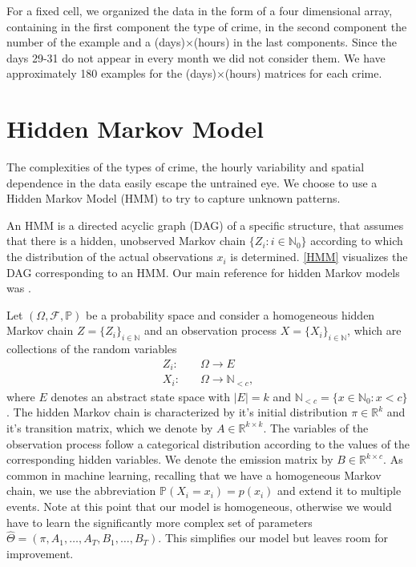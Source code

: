 \documentclass{article}
\begin{document}
For a fixed cell, we organized the data in the form of a four dimensional array, containing in the first component the type of crime, in the second component the number of the example and a (days)$\times$(hours) in the last components. Since the days 29-31 do not appear in every month we did not consider them. We have approximately 180 examples for the (days)$\times$(hours) matrices for each crime.


\section{Hidden Markov Model}
\label{sec:HMM}

The complexities of the types of crime, the hourly variability and spatial dependence in the data easily escape the untrained eye. We choose to use a Hidden Markov Model (HMM) to try to capture unknown patterns. 

An HMM is a directed acyclic graph (DAG) of a specific structure, that assumes that there is a hidden, unobserved Markov chain $\lbrace Z_i: i \in \mathbb{N}_0 \rbrace$  according to which the distribution of the actual observations $x_i$ is determined. \cref{HMM} visualizes the DAG corresponding to an HMM. Our main reference for hidden Markov models was \cite{hmc:em:baum}.


Let $(\Omega,\mathcal{F},\mathbb{P})$ be a probability space and consider a homogeneous hidden Markov chain $Z=\{Z_i\}_{i\in \mathbb{N}}$ and an observation process $X=\{X_i\}_{i\in\mathbb{N}}$, which are collections of the random variables
\begin{align}
Z_i: \quad &\Omega \rightarrow E \\
X_i: \quad &\Omega \rightarrow \mathbb{N}_{< c},
\end{align}
where $E$ denotes an abstract state space with $\vert E \vert =k$ and $\mathbb{N}_{<c}= \lbrace x \in \mathbb{N}_0 : x < c \rbrace$.
The hidden Markov chain is characterized by it's initial distribution $\pi \in \mathbb{R}^k$ and it's transition matrix, which we denote by $A \in \mathbb{R}^{k \times k}$. The variables of the observation process follow a categorical distribution according to the values of the corresponding hidden variables. We denote the emission matrix by $B \in \mathbb{R}^{k \times c}$.  As common in machine learning, recalling that we have a homogeneous Markov chain, we use the abbreviation $\mathbb{P}(X_i=x_i) = p(x_i)$ and extend it to multiple events. Note at this point that our model is homogeneous, otherwise we would have to learn the significantly more complex set of parameters 
$\hat{\Theta}= (\pi,A_1,\ldots ,A_T,B_1,\ldots, B_T)$. This simplifies our model but leaves room for improvement.
\end{document}
